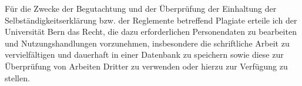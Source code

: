 \documentclass[a4paper,twoside,openright,11pt]{report}
\begin{document}
\vspace*{1cm}

\noindent
Für die Zwecke der Begutachtung und der Überprüfung der Einhaltung der
Selbständigkeitserklärung bzw.  der Reglemente betreffend Plagiate erteile
ich der Universität Bern das Recht, die dazu erforderlichen Personendaten
zu bearbeiten und Nutzungshandlungen vorzunehmen, insbesondere die
schriftliche Arbeit zu vervielfältigen und dauerhaft in einer Datenbank zu
speichern sowie diese zur Überprüfung von Arbeiten Dritter zu verwenden
oder hierzu zur Verfügung zu stellen.

\vspace*{5cm}

\par\noindent\makebox[6cm]{\hrulefill}   \hfill\makebox[8cm]{\hrulefill}
\par\noindent{} \hfill{}
\end{document}
